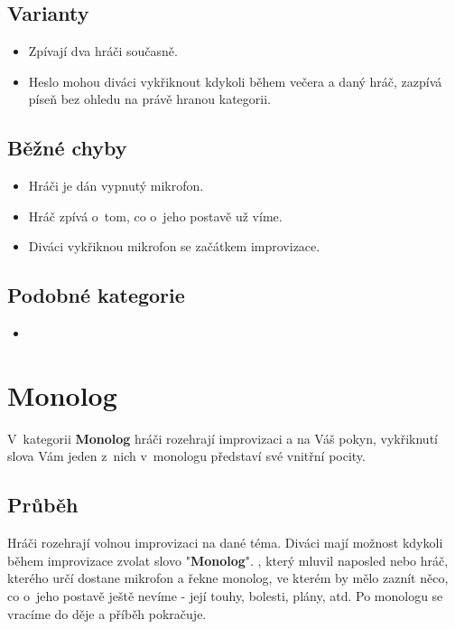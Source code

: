 \subsection{ Varianty } \begin{itemize}
\item Zpívají dva hráči současně.
\item Heslo   mohou diváci vykřiknout kdykoli během večera a daný hráč, zazpívá píseň bez ohledu na právě hranou kategorii.
\end{itemize}
 
\subsection{ Běžné chyby } \begin{itemize}
\item Hráči je dán vypnutý mikrofon.
\item Hráč zpívá o~tom, co o~jeho postavě už víme.
\item Diváci vykřiknou mikrofon se začátkem improvizace.
\end{itemize}
 
 
\subsection{ Podobné kategorie } \begin{itemize}
\item {}
\end{itemize}
 
 
 
 
 
\needspace{5cm} \section{Monolog} \label{monolog}  
 
 
V~kategorii \textbf{Monolog} hráči rozehrají improvizaci a na Váš pokyn, vykřiknutí slova   Vám jeden z~nich v~monologu představí své vnitřní pocity. 
 
 
\subsection{Průběh} Hráči rozehrají volnou improvizaci na dané téma. Diváci mají možnost kdykoli během improvizace zvolat slovo "\textbf{Monolog}". , který mluvil naposled nebo hráč, kterého určí  dostane mikrofon a řekne monolog, ve kterém by mělo zaznít něco, co o~jeho postavě ještě nevíme - její touhy, bolesti, plány, atd. Po monologu se vracíme do děje a příběh pokračuje.  
 
